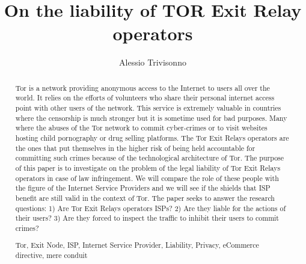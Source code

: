 \documentclass[runningheads,a4paper]{llncs}
\newcommand{\keywords}[1]{\par\addvspace\baselineskip
\noindent\keywordname\enspace\ignorespaces#1}
\begin{document}
\mainmatter  %

\title{On the liability of TOR Exit Relay operators}

\titlerunning{}

%
%
\author{Alessio Trivisonno}
%
\authorrunning{}


%
%

\toctitle{}
\tocauthor{}
\maketitle


\begin{abstract}
Tor is a network providing anonymous access to the Internet to users all over the world. It relies on the efforts of volunteers who share their personal internet access point with other users of the network. This service is extremely valuable in countries where the censorship is much stronger but it is sometime used for bad purposes. Many where the abuses of the Tor network to commit cyber-crimes or to visit websites hosting child pornography or drug selling platforms. The Tor Exit Relays operators are the ones that put themselves in the higher risk of being held accountable for committing such crimes because of the technological architecture of Tor.
The purpose of this paper is to investigate on the problem of the legal liability of Tor Exit Relays operators in case of law infringement. We will compare the role of these people with the figure of the Internet Service Providers and we will see if the shields that ISP benefit are still valid in the context of Tor. The paper seeks to answer the research questions: 1) Are Tor Exit Relays operators ISPs? 2) Are they liable for the actions of their users? 3) Are they forced to inspect the traffic to inhibit their users to commit crimes?

\keywords{Tor, Exit Node, ISP, Internet Service Provider, Liability, Privacy, eCommerce directive, mere conduit}
\end{abstract}
\end{document}
